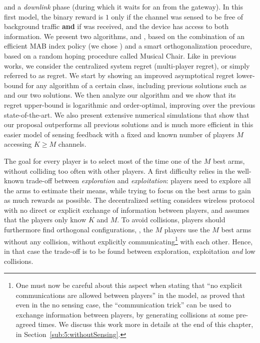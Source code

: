 and a \emph{downlink} phase (during which it waits for an \Ack{} from the gateway).
In this first model, the binary reward is $1$ only if the channel was sensed to be free of background traffic \textbf{and} if \Ack{} was received, and the device has access to both information.
We present two algorithms, \RandTopM{} and \MCTopM, based on the combination of an efficient MAB index policy (we chose \klUCB) and a smart orthogonalization procedure, based on a random hoping procedure called Musical Chair.
Like in previous works, we consider the centralized system regret (multi-player regret), or simply referred to as regret.
We start by showing an improved asymptotical regret lower-bound for any algorithm of a certain class, including previous solutions such as \rhoRand{} and our two solutions.
We then analyze our \MCTopM{} algorithm and we show that its regret upper-bound is logarithmic and order-optimal, improving over the previous state-of-the-art.
We also present extensive numerical simulations that show that our proposal outperforms all previous solutions and is much more efficient in this easier model of sensing feedback with a fixed and known number of players $M$ accessing $K \geq M$ channels.



The goal for every player is to select most of the time one of the $M$ best arms, without colliding too often with other players.
A first difficulty relies in the well-known trade-off between \emph{exploration} and \emph{exploitation}: players need to explore all the arms to estimate their means, while trying to focus on the best arms to gain as much rewards as possible.
The decentralized setting considers wireless protocol with no direct or explicit exchange of information between players, and assumes that the players only know $K$ and $M$. To avoid collisions, players should furthermore find orthogonal configurations, \ie, the $M$ players use the $M$ best arms without any collision, without explicitly communicating\footnote{One must now be careful about this aspect when stating that ``no explicit communications are allowed between players'' in the model, as \cite{BoursierPerchet18} proved that even in the no sensing case, the ``communication trick'' can be used to exchange information between players, by generating collisions at some pre-agreed times. We discuss this work more in details at the end of this chapter, in Section~\ref{sub:5:withoutSensing}.} with each other.
Hence, in that case the trade-off is to be found between exploration, exploitation \emph{and} low collisions.

